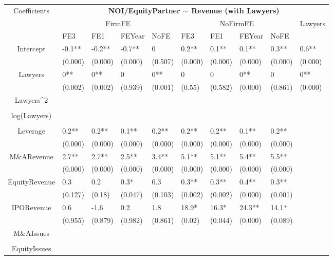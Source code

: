 \documentclass{article}
\begin{document}
\begin{table}[H]
\centering
\begin{tabular}{|clllllllll|}
\hline
\multirow{3}{*}{Coefficients} & \multicolumn{9}{c|}{\textbf{NOI/EquityPartner $\sim$ Revenue (with Lawyers)}} \\
\cline{2-10}
& \multicolumn{4}{c}{FirmFE} & \multicolumn{4}{c}{NoFirmFE} & \multirow{2}{*}{Lawyers} \\
\cline{2-9}
& FE3 & FE1 & FEYear & NoFE & FE3 & FE1 & FEYear & NoFE &  \\
\hline
 
Intercept & -0.1** & -0.2** & -0.7** & 0 & 0.2** & 0.1** & 0.1** & 0.3** & 0.6** \\ 
   & (0.000) & (0.000) & (0.000) & (0.507) & (0.000) & (0.000) & (0.000) & (0.000) & (0.000) \\ 
  Lawyers & 0** & 0** & 0 & 0** & 0 & 0 & 0** & 0 & 0** \\ 
   & (0.002) & (0.002) & (0.939) & (0.001) & (0.55) & (0.582) & (0.000) & (0.861) & (0.000) \\ 
  Lawyers^2 &  &  &  &  &  &  &  &  &  \\ 
   &  &  &  &  &  &  &  &  &  \\ 
  log(Lawyers) &  &  &  &  &  &  &  &  &  \\ 
   &  &  &  &  &  &  &  &  &  \\ 
  Leverage & 0.2** & 0.2** & 0.1** & 0.2** & 0.2** & 0.2** & 0.1** & 0.2** &  \\ 
   & (0.000) & (0.000) & (0.000) & (0.000) & (0.000) & (0.000) & (0.000) & (0.000) &  \\ 
  M\&ARevenue & 2.7** & 2.7** & 2.5** & 3.4** & 5.1** & 5.1** & 5.4** & 5.5** &  \\ 
   & (0.000) & (0.000) & (0.000) & (0.000) & (0.000) & (0.000) & (0.000) & (0.000) &  \\ 
  EquityRevenue & 0.3 & 0.2 & 0.3* & 0.3 & 0.3** & 0.3** & 0.4** & 0.3** &  \\ 
   & (0.127) & (0.18) & (0.047) & (0.103) & (0.002) & (0.002) & (0.000) & (0.001) &  \\ 
  IPORevenue & 0.6 & -1.6 & 0.2 & 1.8 & 18.9* & 16.3* & 24.3** & 14.1$^{+}$ &  \\ 
   & (0.955) & (0.879) & (0.982) & (0.861) & (0.02) & (0.044) & (0.000) & (0.089) &  \\ 
  M\&AIssues &  &  &  &  &  &  &  &  &  \\ 
   &  &  &  &  &  &  &  &  &  \\ 
  EquityIssues &  &  &  &  &  &  &  &  &  \\ 

\end{tabular}
\end{table}
\end{document}

